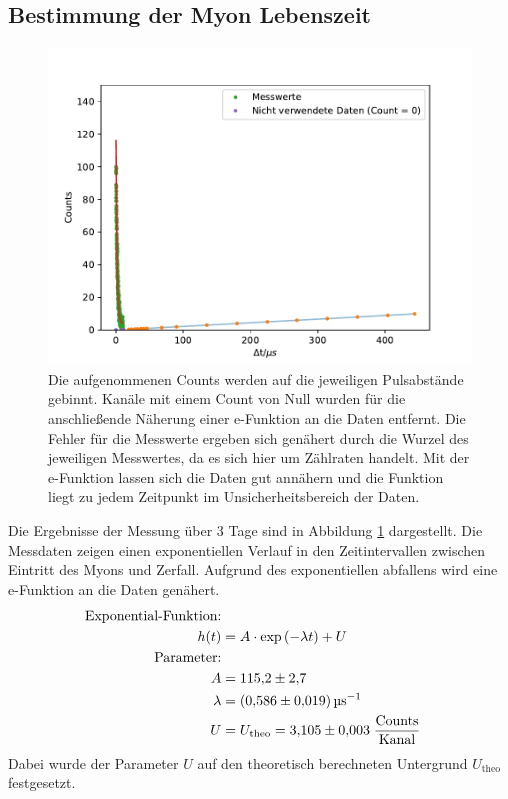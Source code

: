 \subsection{Bestimmung der Myon Lebenszeit}

\begin{figure}[ht]
    \centering
    \includegraphics[scale = 1]{./plots/e-fkt.pdf}
    \caption{Die aufgenommenen Counts werden auf die jeweiligen Pulsabstände gebinnt. Kanäle mit einem Count von Null wurden für die anschließende Näherung einer e-Funktion an die Daten entfernt. Die Fehler für die Messwerte ergeben sich genähert durch die Wurzel des jeweiligen Messwertes, da es sich hier um Zählraten handelt. Mit der e-Funktion lassen sich die Daten gut annähern und die Funktion liegt zu jedem Zeitpunkt im Unsicherheitsbereich der Daten.}
    \label{fig:efkt}
\end{figure}

Die Ergebnisse der Messung über 3 Tage sind in Abbildung \ref{fig:efkt} dargestellt.
Die Messdaten zeigen einen exponentiellen Verlauf in den Zeitintervallen zwischen Eintritt des Myons und Zerfall.
Aufgrund des exponentiellen abfallens wird eine e-Funktion an die Daten genähert.
\begin{align*}
    \text{Exponential-Funktion:}\\
    h(t) &= A \cdot \text{exp} \left(-\lambda t\right) + U\\
    \text{Parameter:}\\
    A &= \num{115.2 +- 2.7}\\
    \lambda &= \SI[per-mode=reciprocal]{0.586 +- 0.019}{\per\micro\second}\\
    U &= U_{\text{theo}} = \num{3.105 +- 0.003}\; \frac{\text{Counts}}{\text{Kanal}} \\
\end{align*}
Dabei wurde der Parameter $U$ auf den theoretisch berechneten Untergrund $U_{\text{theo}}$ festgesetzt.


